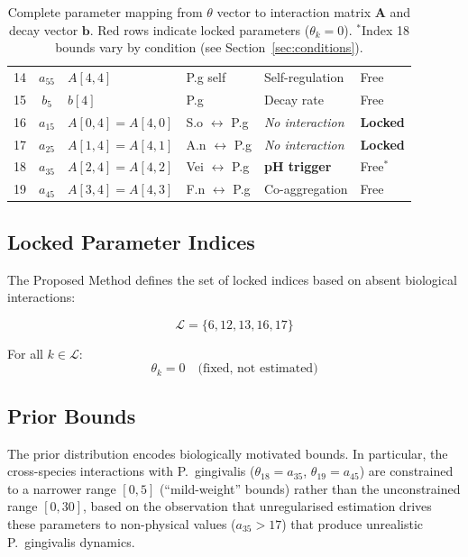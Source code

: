 \documentclass[11pt,a4paper]{article}
\begin{document}
\begin{table}[h]
\begin{tabular}{ccllll}
\midrule
14 & $a_{55}$ & $A[4,4]$ & P.g self & Self-regulation & Free \\
15 & $b_5$ & $b[4]$ & P.g & Decay rate & Free \\
\midrule
\rowcolor{red!15}
16 & $a_{15}$ & $A[0,4]=A[4,0]$ & S.o $\leftrightarrow$ P.g & \textit{No interaction} & \textbf{Locked} \\
\rowcolor{red!15}
17 & $a_{25}$ & $A[1,4]=A[4,1]$ & A.n $\leftrightarrow$ P.g & \textit{No interaction} & \textbf{Locked} \\
18 & $a_{35}$ & $A[2,4]=A[4,2]$ & Vei $\leftrightarrow$ P.g & \textbf{pH trigger} & Free$^*$ \\
19 & $a_{45}$ & $A[3,4]=A[4,3]$ & F.n $\leftrightarrow$ P.g & Co-aggregation & Free \\
\bottomrule
\end{tabular}
\caption{Complete parameter mapping from $\theta$ vector to interaction matrix $\mathbf{A}$ and decay vector $\mathbf{b}$. Red rows indicate locked parameters ($\theta_k = 0$). $^*$Index 18 bounds vary by condition (see Section~\ref{sec:conditions}).}
\label{tab:theta_mapping}
\end{table}

\subsection{Locked Parameter Indices}

The Proposed Method defines the set of locked indices based on absent biological interactions:

\begin{equation}
\mathcal{L} = \{6, 12, 13, 16, 17\}
\end{equation}

For all $k \in \mathcal{L}$:
\begin{equation}
\theta_k = 0 \quad \text{(fixed, not estimated)}
\end{equation}

\subsection{Prior Bounds}
\label{sec:prior_bounds}

The prior distribution encodes biologically motivated bounds. In particular, the cross-species interactions with P.~gingivalis ($\theta_{18} = a_{35}$, $\theta_{19} = a_{45}$) are constrained to a narrower range $[0, 5]$ (``mild-weight'' bounds) rather than the unconstrained range $[0, 30]$, based on the observation that unregularised estimation drives these parameters to non-physical values ($a_{35} > 17$) that produce unrealistic P.~gingivalis dynamics.
\end{document}
